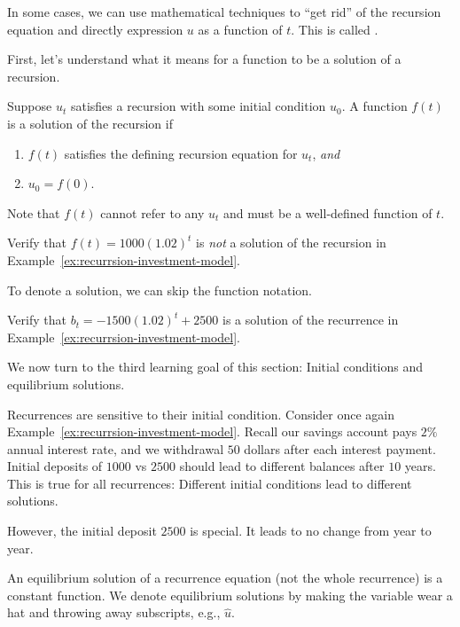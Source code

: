 \documentclass[../main.tex]{subfiles}
\begin{document}
In some cases, we can use mathematical techniques to ``get rid'' of the recursion equation and directly expression \(u\) as a function of \(t\). This is called .

First, let's understand what it means for a function to be a solution of a recursion. 

\begin{definition}
  Suppose \(u_{t}\) satisfies a recursion with some initial condition \(u_{0}\). A function \(f(t)\) is a solution of the recursion if 
  \begin{enumerate}
    \item \(f(t)\) satisfies the defining recursion equation for \(u_{t}\), \emph{and}
    \item \(u_{0} = f(0)\).
  \end{enumerate}

  Note that \(f(t)\) cannot refer to any \(u_{t}\) and must be a well-defined function of \(t\).
\end{definition}

\begin{example}
  Verify that \(f(t) = 1000 (1.02)^{t}\) is \emph{not} a solution of the recursion in Example~\ref{ex:recurrsion-investment-model}.
\end{example}
\clearpage

To denote a solution, we can skip the function notation.
\begin{example}
  Verify that \(b_{t} = -1500 (1.02)^{t} + 2500\) is a solution of the recurrence in Example~\ref{ex:recurrsion-investment-model}.
\end{example}
\clearpage

We now turn to the third learning goal of this section: Initial conditions and equilibrium solutions. 

Recurrences are sensitive to their initial condition. Consider once again Example~\ref{ex:recurrsion-investment-model}. Recall our savings account pays \(2\%\) annual interest rate, and we withdrawal \(50\) dollars after each interest payment.  Initial deposits of \(1000\) vs \(2500\) should lead to different balances after \(10\) years.  This is true for all recurrences: Different initial conditions lead to different solutions.

However, the initial deposit \(2500\) is special. It leads to no change from year to year.

\begin{definition}
  An equilibrium solution of a recurrence equation (not the whole recurrence) is a constant function.  We denote equilibrium solutions by making the variable wear a hat and throwing away subscripts, e.g., \(\hat{u}\).
\end{definition}
\end{document}
